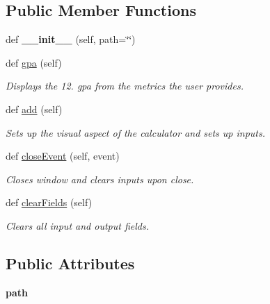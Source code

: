 \subsection*{Public Member Functions}
\begin{DoxyCompactItemize}
\item 
\mbox{\label{classgpa__ui_1_1_g_p_a_window_ae2a617733f39b23bf5eae4e356ddb5ed}} 
def {\bfseries \+\_\+\+\_\+init\+\_\+\+\_\+} (self, path=\char`\"{}\char`\"{})
\item 
def \hyperlink{classgpa__ui_1_1_g_p_a_window_a36e992cfdee2fc99be76c95f6a342249}{gpa} (self)
\begin{DoxyCompactList}\small\item\em Displays the 12. gpa from the metrics the user provides. \end{DoxyCompactList}\item 
def \hyperlink{classgpa__ui_1_1_g_p_a_window_aca39733da3d44f4a5d694d7becea6832}{add} (self)
\begin{DoxyCompactList}\small\item\em Sets up the visual aspect of the calculator and sets up inputs. \end{DoxyCompactList}\item 
\mbox{\label{classgpa__ui_1_1_g_p_a_window_aa3d8cc6a27a5ae6df93e77553a4bd4fe}} 
def \hyperlink{classgpa__ui_1_1_g_p_a_window_aa3d8cc6a27a5ae6df93e77553a4bd4fe}{close\+Event} (self, event)
\begin{DoxyCompactList}\small\item\em Closes window and clears inputs upon close. \end{DoxyCompactList}\item 
\mbox{\label{classgpa__ui_1_1_g_p_a_window_ad32cdace9a8a570568c48f9ca017aea3}} 
def \hyperlink{classgpa__ui_1_1_g_p_a_window_ad32cdace9a8a570568c48f9ca017aea3}{clear\+Fields} (self)
\begin{DoxyCompactList}\small\item\em Clears all input and output fields. \end{DoxyCompactList}\end{DoxyCompactItemize}
\subsection*{Public Attributes}
\begin{DoxyCompactItemize}
\item 
\mbox{\label{classgpa__ui_1_1_g_p_a_window_a34487c55a57218bbaac85f9d1d7ab75e}} 
{\bfseries path}
\end{DoxyCompactItemize}
